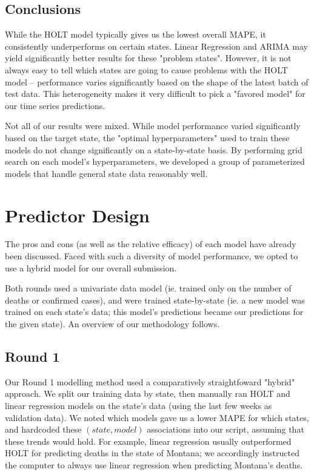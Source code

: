 \documentclass[sigconf,nonacm]{acmart}
\begin{document}
\subsection{Conclusions}

While the HOLT model typically gives us the lowest overall MAPE, it
consistently underperforms on certain states. Linear Regression and ARIMA may
yield significantly better results for these "problem states". However, it is
not always easy to tell which states are going to cause problems with the HOLT
model -- performance varies significantly based on the shape of the latest
batch of test data. This heterogeneity makes it very difficult to pick a
"favored model" for our time series predictions. 

Not all of our results were mixed. While model performance varied significantly
based on the target state, the "optimal hyperparameters" used to train these
models do not change significantly on a state-by-state basis. By performing
grid search on each model's hyperparameters, we developed a group of
parameterized models that handle general state data reasonably well. 


\section{Predictor Design}

The pros and cons (as well as the relative efficacy) of each model have already
been discussed. Faced with such a diversity of model performance, we opted to
use a hybrid model for our overall submission. 

Both rounds used a univariate data model (ie. trained only on the number of
deaths or confirmed cases), and were trained state-by-state (ie. a new model
was trained on each state's data; this model's predictions became our
predictions for the given state). An overview of our methodology follows. 

\subsection{Round 1}

Our Round 1 modelling method used a comparatively straightfoward "hybrid"
approach. We split our training data by state, then manually ran HOLT and
linear regression models on the state's data (using the last few weeks as
validation data). We noted which models gave us a lower MAPE for which states,
and hardcoded these $(state, model)$ associations into our script, assuming
that these trends would hold. For example, linear regression usually
outperformed HOLT for predicting deaths in the state of Montana; we accordingly
instructed the computer to always use linear regression when predicting
Montana's deaths. 
\end{document}
